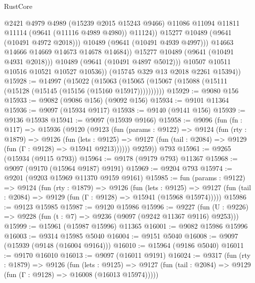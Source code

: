 \begin{lexlean}{RustCore}
\begin{coremodule}
                          @2421
                          @4979
                          @4989
                          (@15239 @2015 @15243 @9466)
                          @11086
                          @11094
                          @11811
                          @11114
                          (@9641 (@11116 @4989 @4980))
                          @11124))
                      @15277
                      @10489
                      (@9641 (@10491 @4972 @2018)))
                    @10489
                    (@9641 (@10491 @4939 @4997)))
                  @14663
                  @14666
                  @14669
                  @14673
                  @14678
                  @14684))
              @15277
              @10489
              (@9641 (@10491 @4931 @2018)))
            @10489
            (@9641 (@10491 @4897 @5012)))
          @10507
          @10511
          @10516
          @10521
          @10527
          @10536))
      (@15745 @329 @13 @2018 @2261 @15394))
@15928 := @14997
    (@15022 (@15063 (@15065 (@15067 (@15088 (@15111 (@15128 (@15145 (@15156 (@15160 @15917))))))))))
@15929 := @9080 @156
@15933 := @9082 (@9086 @156) (@9092 @156)
@15934 := @9101 @11364
@15936 := @9097 (@15934 @9117)
@15938 := @9140 (@9141 @156)
@15939 := @9136 @15938
@15941 := @9097 (@15939 @9166)
@15958 := @9096
    (fun (fn : @117) =>
    @15936
      (@9120
        (@9123
          (fun (params : @9122) =>
          @9124
            (fun (rty : @1879) =>
            @9126
              (fun (lets : @9125) =>
              @9127 (fun (tail : @2084) => @9129 (fun (Γ : @9128) => @15941 @9213))))))
        @9259))
    @793
@15961 := @9265 (@15934 (@9115 @793))
@15964 := @9178 (@9179 @793) @11367
@15968 := @9097 (@9170 (@15964 @9187) @9191)
@15969 := @9204 @793
@15974 := @9201 (@9203 @15969 @11370 @9159 @9161)
@15985 := fun (params : @9122) =>
  @9124
    (fun (rty : @1879) =>
    @9126
      (fun (lets : @9125) =>
      @9127 (fun (tail : @2084) => @9129 (fun (Γ : @9128) => @15941 (@15968 @15974)))))
@15986 := @9123 @15985
@15987 := @9120 @15986
@15996 := @9227
    (fun (U : @9226) => @9228 (fun (t : @7) => @9236 (@9097 (@9242 @11367 @9116) @9253)))
@15999 := @15961 (@15987 @15996) @11365
@16001 := @9082 @15986 @15996
@16003 := @9314 @15985 @5040
@16004 := @9151 @5040
@16008 := @9097 (@15939 (@9148 (@16004 @9164)))
@16010 := @15964 (@9186 @5040)
@16011 := @9170 @16010
@16013 := @9097 (@16011 @9191)
@16024 := @9317
    (fun (rty : @1879) =>
    @9126
      (fun (lets : @9125) =>
      @9127 (fun (tail : @2084) => @9129 (fun (Γ : @9128) => @16008 (@16013 @15974)))))

\end{coremodule}
\end{lexlean}
